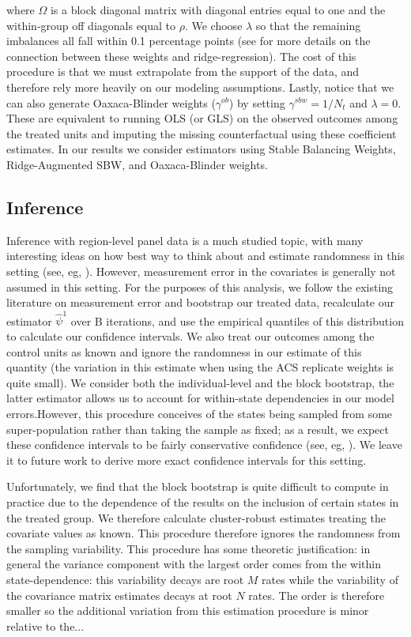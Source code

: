 \documentclass[12pt]{article}
\begin{document}
where $\Omega$ is a block diagonal matrix with diagonal entries equal to one and the within-group off diagonals equal to $\rho$. We choose $\lambda$ so that the remaining imbalances all fall within 0.1 percentage points (see \cite{ben2018augmented} for more details on the connection between these weights and ridge-regression). The cost of this procedure is that we must extrapolate from the support of the data, and therefore rely more heavily on our modeling assumptions. Lastly, notice that we can also generate Oaxaca-Blinder weights ($\gamma^{ob}$) by setting $\gamma^{sbw} = 1/N_t$ and $\lambda = 0$. These are equivalent to running OLS (or GLS) on the observed outcomes among the treated units and imputing the missing counterfactual using these coefficient estimates. In our results we consider estimators using Stable Balancing Weights, Ridge-Augmented SBW, and Oaxaca-Blinder weights. 

\subsection{Inference}

Inference with region-level panel data is a much studied topic, with many interesting ideas on how best way to think about and estimate randomness in this setting (see, eg, \cite{chernozhukov2017exact}). However, measurement error in the covariates is generally not assumed in this setting. For the purposes of this analysis, we follow the existing literature on measurement error and bootstrap our treated data, recalculate our estimator $\hat{\psi}^1$ over B iterations, and use the empirical quantiles of this distribution to calculate our confidence intervals. We also treat our outcomes among the control units as known and ignore the randomness in our estimate of this quantity (the variation in this estimate when using the ACS replicate weights is quite small). We consider both the individual-level and the block bootstrap, the latter estimator allows us to account for within-state dependencies in our model errors.However, this procedure conceives of the states being sampled from some super-population rather than taking the sample as fixed; as a result, we expect these confidence intervals to be fairly conservative confidence (see, eg, \cite{athey2017econometrics}). We leave it to future work to derive more exact confidence intervals for this setting.

Unfortunately, we find that the block bootstrap is quite difficult to compute in practice due to the dependence of the results on the inclusion of certain states in the treated group. We therefore calculate cluster-robust estimates treating the covariate values as known. This procedure therefore ignores the randomness from the sampling variability. This procedure has some theoretic justification: in general the variance component with the largest order comes from the within state-dependence: this variability decays are root $M$ rates while the variability of the covariance matrix estimates decays at root $N$ rates. The order is therefore smaller so the additional variation from this estimation procedure is minor relative to the...
\end{document}
